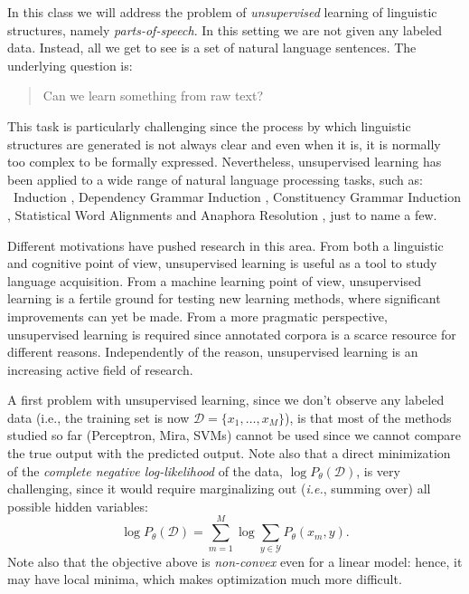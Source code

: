 In this class we will address the problem of \emph{unsupervised} learning of linguistic structures, namely 
\emph{parts-of-speech}. 
In this setting we are not given any labeled data. Instead, all we get to see is a set of natural language sentences.  
The underlying question is: 

\begin{quote}
Can we learn something from raw text?
\end{quote}

This task is particularly challenging since the process by which linguistic structures are generated is not always clear 
and even when it is, it is normally too complex to be
formally expressed. Nevertheless, unsupervised learning has been applied to a
wide range of natural language processing tasks, such as: 
\pos\ Induction  \citep{schutze1995distributional,merialdo1994tet,clark03combining},
Dependency Grammar Induction \citep{klein2004acl,smith2006annealing}, Constituency Grammar Induction \citep{klein2004acl}, Statistical Word Alignments 
\citep{brown94mathematic} and Anaphora Resolution \citep{charniak2009works}, just to name a few. 

Different motivations have pushed research in this area. From both a linguistic and cognitive point of view, 
unsupervised learning is useful as a tool to study language acquisition. 
From a machine learning point of view, unsupervised learning is a fertile ground for testing new learning methods, 
where significant improvements can yet be made. 
From a more pragmatic perspective, unsupervised learning is required
since annotated corpora is a scarce resource for different reasons. Independently of the reason, unsupervised learning is an increasing active field of research.

A first problem with unsupervised learning, since we don't observe any labeled data (i.e., 
the training set is now $\mathcal{D} = \{x_1,\ldots, x_M\}$), 
is that most of the methods studied so far (Perceptron, Mira, SVMs) cannot be used since we cannot compare 
the true output with the predicted output. 
Note also that a direct minimization of the \emph{complete negative log-likelihood} of the data, $\log P_{\theta}(\mathcal{D})$, 
is very challenging, since it would require marginalizing out (\emph{i.e.}, summing over) all possible hidden variables:
\begin{equation}
 \log P_{\theta}(\mathcal{D}) =  \sum_{m=1}^M \log \sum_{y \in \mathcal{Y}} P_{\theta} (x_m,y).
\end{equation}
Note also that the objective above is \emph{non-convex} even for a linear model: hence, it may have local minima, which makes optimization much 
more difficult. 

